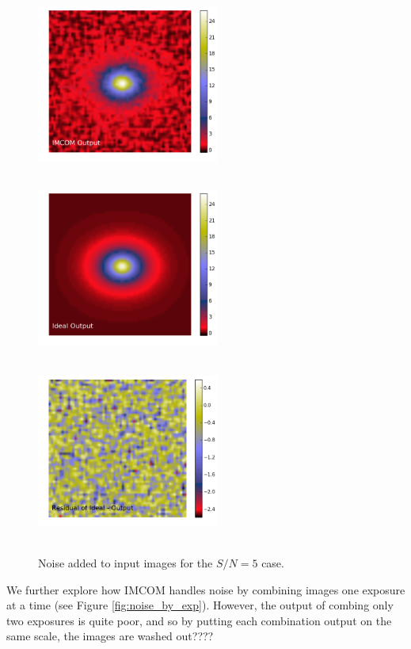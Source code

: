 \documentclass[12pt,preprint]{aastex6}
\begin{document}
\begin{figure}[!htbp]
\includegraphics[height=60mm,width=60mm]{f4f.png}
\includegraphics[height=60mm,width=60mm]{f4g.png}
\includegraphics[height=60mm,width=60mm]{f4h.png}
\caption{Noise added to input images for the $S/N=5$ case.}
\label{fig:noise}
\end{figure}


We further explore how IMCOM handles noise by combining images one exposure at a time (see Figure \ref{fig:noise_by_exp}). However, the output of combing only two exposures is quite poor, and so by putting each combination output on the same scale, the images are washed out????
\end{document}
